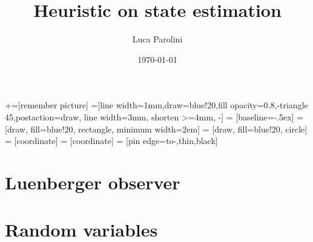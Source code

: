 \documentclass[aspectratio=169, fleqn, 10pt]{beamer}
\title{Heuristic on state estimation}
\author{Luca Parolini}
\date{\today}
\begin{document}
	
+=[remember picture]
=[line width=1mm,draw=blue!20,fill opacity=0.8,-triangle 45,postaction={draw, line width=3mm, shorten >=4mm, -}]
 = [baseline=-.5ex]
 = [draw, fill=blue!20, rectangle, minimum width=2em] %
 = [draw, fill=blue!20, circle] %
 = [coordinate]
 = [coordinate]
 = [pin edge={to-,thin,black}]


\maketitle
\section{Luenberger observer}

\section{Random variables}

\end{document}
